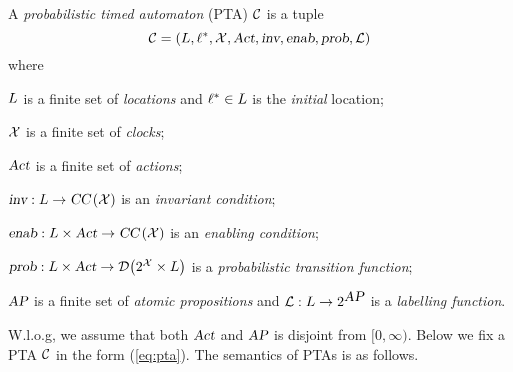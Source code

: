 \vspace{-0.8em}
\begin{definition}
A \emph{probabilistic timed automaton} (PTA) $\mathcal{C}$ is a tuple
\begin{equation}\label{eq:pta}
\mathcal{C}=\left(L, \ell^*, \mathcal{X}, \mbox{\sl Act}, \mbox{\sl inv}, \mbox{\sl enab},  \mbox{\sl prob}, \mathcal{L}\right)
\end{equation}
where
\begin{compactitem}
\item $L$ is a finite set of \emph{locations} and $\ell^*\in L$ is the \emph{initial} location;
\item $\mathcal{X}$ is a finite set of \emph{clocks};
\item $\mbox{\sl Act}$ is a finite set of \emph{actions};
\item $\mbox{\sl inv}:L\rightarrow\mbox{\sl CC}\left(\mathcal{X}\right)$ is
an \emph{invariant condition};
\item $\mbox{\sl enab}:L\times\mbox{\sl Act}\rightarrow\mbox{\sl CC}\left(\mathcal{X}\right)$ is an \emph{enabling condition};
\item $\mbox{\sl prob}:L\times\mbox{\sl Act}\rightarrow{\mathcal{D}}{\left(2^{\mathcal{X}}\times L\right)}$ is a \emph{probabilistic transition function};
\item $\mbox{\sl AP}$ is a finite set of \emph{atomic propositions} and $\mathcal{L}:L\rightarrow 2^{\mbox{\sl AP}}$ is a \emph{labelling function}.
\end{compactitem}
\end{definition}
\vspace{-0.8em}

W.l.o.g, we assume that both $\mbox{\sl Act}$ and $\mbox{\sl AP}$ is disjoint from $[0,\infty)$. Below we fix a PTA $\mathcal{C}$ in the form (\ref{eq:pta}). The semantics of PTAs is as follows.

